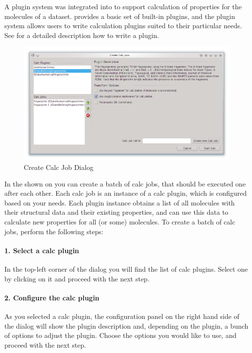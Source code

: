 A plugin system was integrated into \sh to support calculation of properties for the molecules of a dataset.
\sh provides a basic set of built-in plugins, and the plugin system allows users to write calculation plugins suited to their particular needs.
See  for a detailed description how to write a plugin.\\

\begin{figure}[!htb]
   \centering
   \includegraphics[width=\textwidth]{images/sh_create_calc_job_dialog.png}
   \caption{Create Calc Job Dialog}
   \label{fig:createcalcjobdialog}
\end{figure}

In the  shown on  you can create a batch of calc jobs,
that should be executed one after each other.
Each calc job is an instance of a calc plugin, which is configured based on your needs.
Each plugin instance obtains a list of all molecules with their structural data and their existing properties,
and can use this data to calculate new properties for all (or some) molecules.
To create a batch of calc jobs, perform the following steps:

\paragraph{1. Select a calc plugin}
  In the top-left corner of the dialog you will find the list of calc plugins.
  Select one by clicking on it and proceed with the next step.

\paragraph{2. Configure the calc plugin}
  As you selected a calc plugin, the configuration panel on the right hand side of the dialog will show the plugin description
  and, depending on the plugin, a bunch of options to adjust the plugin.
  Choose the options you would like to use, and proceed with the next step.

